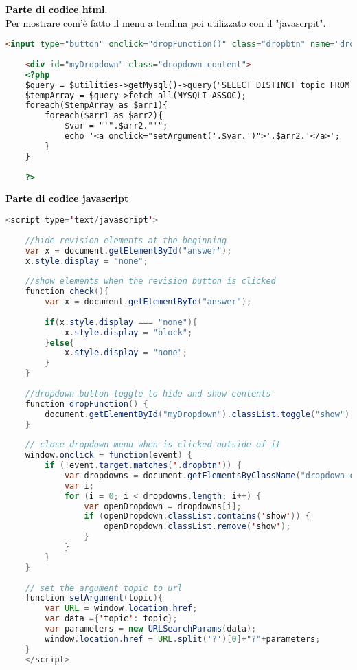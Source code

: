 \textcolor{black}{\textbf{Parte di codice html}. \\Per mostrare com'è fatto il menu a tendina poi utilizzato con il "javascrpit".}\\

\begin{lstlisting}[language=html]
	 <input type="button" onclick="dropFunction()" class="dropbtn" name="dropdown" value="Seleziona capitolo">
	
	<div id="myDropdown" class="dropdown-content">
	<?php
	$query = $utilities->getMysql()->query("SELECT DISTINCT topic FROM charting_test_5d");
	$tempArray = $query->fetch_all(MYSQLI_ASSOC);
	foreach($tempArray as $arr1){
		foreach($arr1 as $arr2){
			$var = "'".$arr2."'";
			echo '<a onclick="setArgument('.$var.')">'.$arr2.'</a>';
		}
	}		
	
	?>			
\end{lstlisting}

\textcolor{black}{\textbf{Parte di codice javascript}}\\

\begin{lstlisting}[language=java]
	<script type='text/javascript'>
	
	//hide revision elements at the beginning
	var x = document.getElementById("answer");
	x.style.display = "none";
	
	//show elements when the revision button is clicked
	function check(){
		var x = document.getElementById("answer");
		
		if(x.style.display === "none"){
			x.style.display = "block";
		}else{
			x.style.display = "none";
		}	
	}
	
	//dropdown button toggle to hide and show contents
	function dropFunction() {
		document.getElementById("myDropdown").classList.toggle("show");
	}
	
	// close dropdown menu when is clicked outside of it
	window.onclick = function(event) {
		if (!event.target.matches('.dropbtn')) {
			var dropdowns = document.getElementsByClassName("dropdown-content");
			var i;
			for (i = 0; i < dropdowns.length; i++) {
				var openDropdown = dropdowns[i];
				if (openDropdown.classList.contains('show')) {
					openDropdown.classList.remove('show');
				}
			}
		}
	}
	
	// set the argument topic to url
	function setArgument(topic){
		var URL = window.location.href;
		var data ={'topic': topic};
		var parameters = new URLSearchParams(data);
		window.location.href = URL.split('?')[0]+"?"+parameters;
	}
	</script>
\end{lstlisting}

